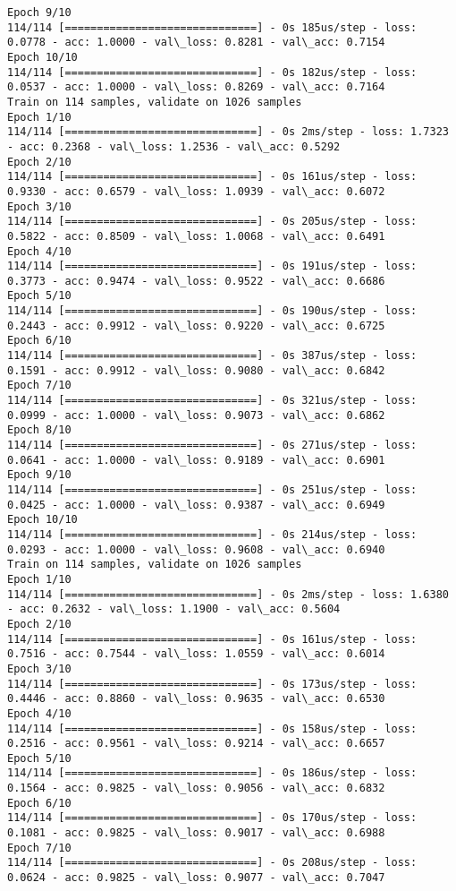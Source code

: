 \documentclass[11pt]{article}
\begin{document}
\begin{Verbatim}[commandchars=\\\{\}]
Epoch 9/10
114/114 [==============================] - 0s 185us/step - loss: 0.0778 - acc: 1.0000 - val\_loss: 0.8281 - val\_acc: 0.7154
Epoch 10/10
114/114 [==============================] - 0s 182us/step - loss: 0.0537 - acc: 1.0000 - val\_loss: 0.8269 - val\_acc: 0.7164
Train on 114 samples, validate on 1026 samples
Epoch 1/10
114/114 [==============================] - 0s 2ms/step - loss: 1.7323 - acc: 0.2368 - val\_loss: 1.2536 - val\_acc: 0.5292
Epoch 2/10
114/114 [==============================] - 0s 161us/step - loss: 0.9330 - acc: 0.6579 - val\_loss: 1.0939 - val\_acc: 0.6072
Epoch 3/10
114/114 [==============================] - 0s 205us/step - loss: 0.5822 - acc: 0.8509 - val\_loss: 1.0068 - val\_acc: 0.6491
Epoch 4/10
114/114 [==============================] - 0s 191us/step - loss: 0.3773 - acc: 0.9474 - val\_loss: 0.9522 - val\_acc: 0.6686
Epoch 5/10
114/114 [==============================] - 0s 190us/step - loss: 0.2443 - acc: 0.9912 - val\_loss: 0.9220 - val\_acc: 0.6725
Epoch 6/10
114/114 [==============================] - 0s 387us/step - loss: 0.1591 - acc: 0.9912 - val\_loss: 0.9080 - val\_acc: 0.6842
Epoch 7/10
114/114 [==============================] - 0s 321us/step - loss: 0.0999 - acc: 1.0000 - val\_loss: 0.9073 - val\_acc: 0.6862
Epoch 8/10
114/114 [==============================] - 0s 271us/step - loss: 0.0641 - acc: 1.0000 - val\_loss: 0.9189 - val\_acc: 0.6901
Epoch 9/10
114/114 [==============================] - 0s 251us/step - loss: 0.0425 - acc: 1.0000 - val\_loss: 0.9387 - val\_acc: 0.6949
Epoch 10/10
114/114 [==============================] - 0s 214us/step - loss: 0.0293 - acc: 1.0000 - val\_loss: 0.9608 - val\_acc: 0.6940
Train on 114 samples, validate on 1026 samples
Epoch 1/10
114/114 [==============================] - 0s 2ms/step - loss: 1.6380 - acc: 0.2632 - val\_loss: 1.1900 - val\_acc: 0.5604
Epoch 2/10
114/114 [==============================] - 0s 161us/step - loss: 0.7516 - acc: 0.7544 - val\_loss: 1.0559 - val\_acc: 0.6014
Epoch 3/10
114/114 [==============================] - 0s 173us/step - loss: 0.4446 - acc: 0.8860 - val\_loss: 0.9635 - val\_acc: 0.6530
Epoch 4/10
114/114 [==============================] - 0s 158us/step - loss: 0.2516 - acc: 0.9561 - val\_loss: 0.9214 - val\_acc: 0.6657
Epoch 5/10
114/114 [==============================] - 0s 186us/step - loss: 0.1564 - acc: 0.9825 - val\_loss: 0.9056 - val\_acc: 0.6832
Epoch 6/10
114/114 [==============================] - 0s 170us/step - loss: 0.1081 - acc: 0.9825 - val\_loss: 0.9017 - val\_acc: 0.6988
Epoch 7/10
114/114 [==============================] - 0s 208us/step - loss: 0.0624 - acc: 0.9825 - val\_loss: 0.9077 - val\_acc: 0.7047

\end{Verbatim}
\end{document}
